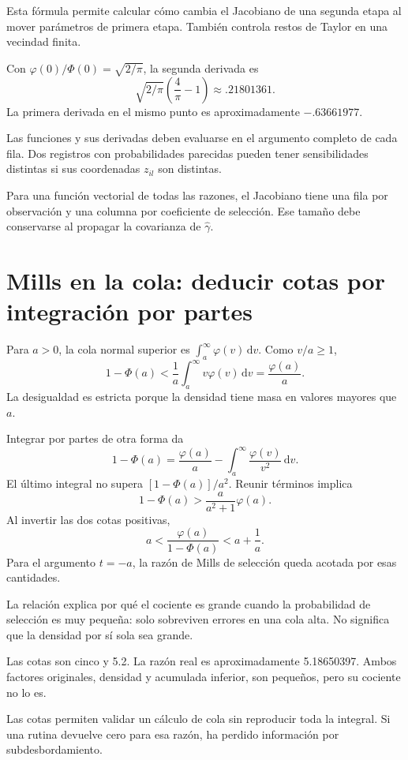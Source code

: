 \documentclass[11pt,a4paper]{article}
\newcommand{\dd}{\,\mathrm d}
\begin{document}
Esta fórmula permite calcular
cómo cambia el Jacobiano de
una segunda etapa al mover
parámetros de primera etapa.
También controla restos de Taylor
en una vecindad finita.

\begin{ejemplo}
Con \(\varphi(0)/\Phi(0)=\sqrt{2/\pi}\),
la segunda derivada es
\[
\sqrt{2/\pi}\left(\frac4\pi-1\right)
\approx.21801361.
\]
La primera derivada en el mismo punto
es aproximadamente \(-.63661977\).
\end{ejemplo}
Las funciones y sus derivadas
deben evaluarse en el argumento
completo de cada fila.
Dos registros con probabilidades
parecidas pueden tener sensibilidades
distintas si sus coordenadas
\(z_{il}\) son distintas.

Para una función vectorial
de todas las razones,
el Jacobiano tiene una fila
por observación y una columna
por coeficiente de selección.
Ese tamaño debe conservarse
al propagar la covarianza de \(\widehat\gamma\).

\clearpage
\section{Mills en la cola: deducir cotas por integración por partes}\label{unidad73}
Para \(a>0\), la cola normal superior es
\(\int_a^\infty\varphi(v)\dd v\).
Como \(v/a\ge1\),
\[
1-\Phi(a)<\frac1a\int_a^\infty v\varphi(v)\dd v
=\frac{\varphi(a)}a.
\]
La desigualdad es estricta
porque la densidad tiene masa
en valores mayores que \(a\).

Integrar por partes de otra forma da
\[
1-\Phi(a)=\frac{\varphi(a)}a
-\int_a^\infty\frac{\varphi(v)}{v^2}\dd v.
\]
El último integral no supera
\([1-\Phi(a)]/a^2\).
Reunir términos implica
\[
1-\Phi(a)>
\frac{a}{a^2+1}\varphi(a).
\]
Al invertir las dos cotas positivas,
\[
\boxed{
a<\frac{\varphi(a)}{1-\Phi(a)}<a+\frac1a}.
\]
Para el argumento \(t=-a\),
la razón de Mills de selección
queda acotada por esas cantidades.

La relación explica por qué
el cociente es grande cuando
la probabilidad de selección
es muy pequeña: solo sobreviven
errores en una cola alta.
No significa que la densidad
por sí sola sea grande.

\begin{ejemplo}
Las cotas son cinco y 5.2.
La razón real es aproximadamente 5.18650397.
Ambos factores originales,
densidad y acumulada inferior,
son pequeños, pero su cociente
no lo es.
\end{ejemplo}
Las cotas permiten validar
un cálculo de cola sin
reproducir toda la integral.
Si una rutina devuelve cero
para esa razón, ha perdido
información por subdesbordamiento.
\end{document}
